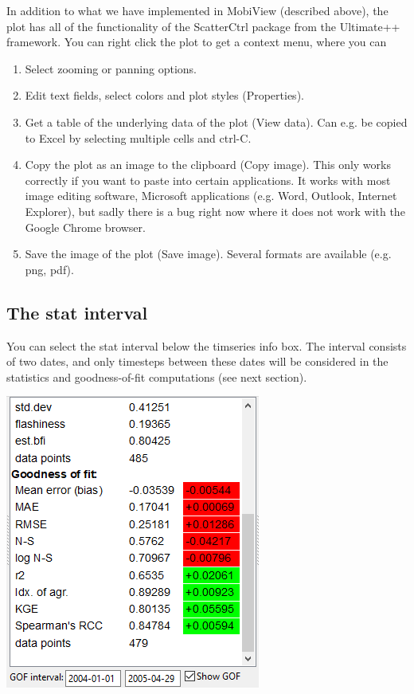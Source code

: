 \documentclass[11pt]{article}
\theoremstyle{definition}
\begin{document}
In addition to what we have implemented in MobiView (described above), the plot has all of the functionality of the ScatterCtrl package from the Ultimate++ framework. You can right click the plot to get a context menu, where you can
\begin{enumerate}[i]
\item Select zooming or panning options.
\item Edit text fields, select colors and plot styles (Properties).
\item Get a table of the underlying data of the plot (View data). Can e.g. be copied to Excel by selecting multiple cells and ctrl-C.
\item Copy the plot as an image to the clipboard (Copy image). This only works correctly if you want to paste into certain applications. It works with most image editing software, Microsoft applications (e.g. Word, Outlook, Internet Explorer), but sadly there is a bug right now where it does not work with the Google Chrome browser.
\item Save the image of the plot (Save image). Several formats are available (e.g. png, pdf).
\end{enumerate}

\subsection{The stat interval}\label{sec:gofint}

You can select the stat interval below the timseries info box. The interval consists of two dates, and only timesteps between these dates will be considered in the statistics and goodness-of-fit computations (see next section).

\begin{center}
\includegraphics[width=0.3\linewidth]{img/gof}
\end{center}
\end{document}
